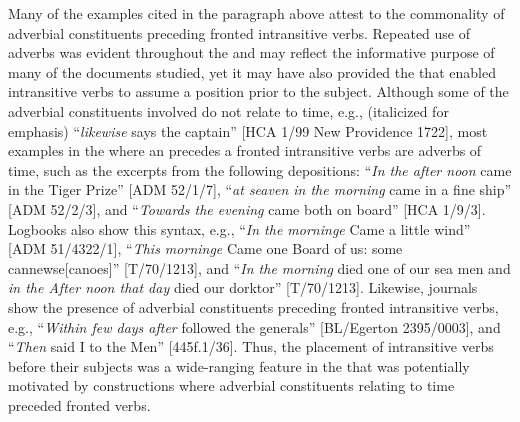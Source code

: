 Many of the examples cited in the paragraph above attest to the commonality of adverbial constituents preceding fronted intransitive verbs. Repeated use of adverbs was evident throughout the  and may reflect the informative purpose of many of the documents studied, yet it may have also provided the  that enabled intransitive verbs to assume a position prior to the  subject. Although some of the adverbial constituents involved do not relate to time, e.g., (italicized for emphasis) “\textit{likewise} says the captain” [HCA 1/99 New Providence 1722], most examples in the  where an  precedes a fronted intransitive verbs are adverbs of time, such as the excerpts from the following depositions: “\textit{In the after noon} came in the Tiger Prize” [ADM 52/1/7], “\textit{at seaven in the morning} came in a fine ship” [ADM 52/2/3], and “\textit{Towards the evening} came both on board” [HCA 1/9/3]. Logbooks also show this syntax, e.g., “\textit{In the morninge} Came a little wind” [ADM 51/4322/1], “\textit{This morninge} Came one Board of us: some cannewse[canoes]” [T/70/1213], and “\textit{In the morning} died one of our sea men and \textit{in the After noon that day} died our dorktor” [T/70/1213]. Likewise, journals show the presence of adverbial constituents preceding fronted intransitive verbs, e.g., “\textit{Within few days after} followed the generals” [BL/Egerton 2395/0003], and “\textit{Then} said I to the Men” [445f.1/36]. Thus, the placement of intransitive verbs before their  subjects was a wide-ranging feature in the  that was potentially motivated by constructions where adverbial constituents relating to time preceded fronted verbs.  

